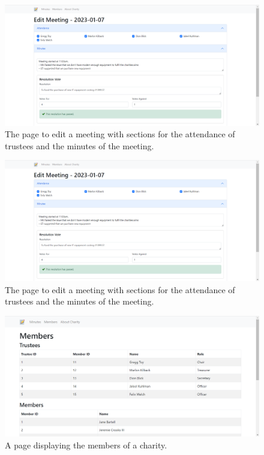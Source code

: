 \documentclass{UoYCSproject}
\begin{document}
\begin{figure}[H]
\begin{center}
\includegraphics[width=\textwidth]{"./assets/apendix/frontend-screenshots/Minutes Edit - Overview.png"}
\end{center}
\caption{The page to edit a meeting with sections for the attendance of trustees and the minutes of the meeting.}
\end{figure}

\begin{figure}[H]
\begin{center}
\includegraphics[width=\textwidth]{"./assets/apendix/frontend-screenshots/Minutes Edit - Overview.png"}
\end{center}
\caption{The page to edit a meeting with sections for the attendance of trustees and the minutes of the meeting.}
\end{figure}

\begin{figure}[H]
\begin{center}
\includegraphics[width=\textwidth]{"./assets/apendix/frontend-screenshots/Members.png"}
\end{center}
\caption{A page displaying the members of a charity.}
\end{figure}
\end{document}
